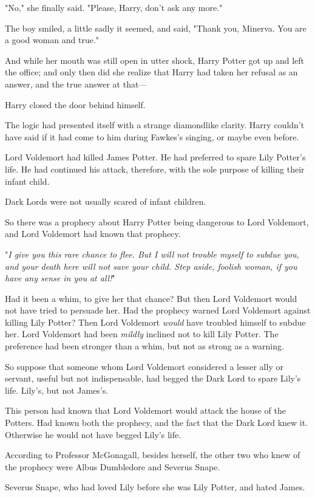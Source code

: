 "No," she finally said. "Please, Harry, don't ask any more."

The boy smiled, a little sadly it seemed, and said, "Thank you, Minerva. You 
are a good woman and true."

And while her mouth was still open in utter shock, Harry Potter got up and left 
the office; and only then did she realize that Harry had taken her refusal as 
an answer, and the true answer at that---

Harry closed the door behind himself.

The logic had presented itself with a strange diamondlike clarity. Harry 
couldn't have said if it had come to him during Fawkes's singing, or maybe even 
before.

Lord Voldemort had killed James Potter. He had preferred to spare Lily Potter's 
life. He had continued his attack, therefore, with the sole purpose of killing 
their infant child.

Dark Lords were not usually scared of infant children.

So there was a prophecy about Harry Potter being dangerous to Lord Voldemort, 
and Lord Voldemort had known that prophecy.

"\emph{I give you this rare chance to flee. But I will not trouble myself to 
subdue you, and your death here will not save your child. Step aside, foolish 
woman, if you have any sense in you at all!}"

Had it been a whim, to give her that chance? But then Lord Voldemort would not 
have tried to persuade her. Had the prophecy warned Lord Voldemort against 
killing Lily Potter? Then Lord Voldemort \emph{would} have troubled himself to 
subdue her. Lord Voldemort had been \emph{mildly} inclined not to kill Lily 
Potter. The preference had been stronger than a whim, but not as strong as a 
warning.

So suppose that someone whom Lord Voldemort considered a lesser ally or 
servant, useful but not indispensable, had begged the Dark Lord to spare Lily's 
life. Lily's, but not James's.

This person had known that Lord Voldemort would attack the house of the 
Potters. Had known both the prophecy, and the fact that the Dark Lord knew it. 
Otherwise he would not have begged Lily's life.

According to Professor McGonagall, besides herself, the other two who knew of 
the prophecy were Albus Dumbledore and Severus Snape.

Severus Snape, who had loved Lily before she was Lily Potter, and hated James.

